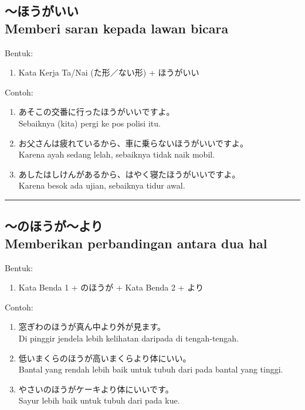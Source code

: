 \subsection*{
    ～ほうがいい \\
    Memberi saran kepada lawan bicara
}
Bentuk:
\begin{enumerate}
    \item Kata Kerja Ta/Nai (た形／ない形) + ほうがいい
\end{enumerate}
Contoh: 
\begin{enumerate}
    \item あそこの交番に行ったほうがいいですよ。
    \\ Sebaiknya (kita) pergi ke pos polisi itu.
    \item お父さんは疲れているから、車に乗らないほうがいいですよ。
    \\ Karena ayah sedang lelah, sebaiknya tidak naik mobil.
    \item あしたはしけんがあるから、はやく寝たほうがいいですよ。
    \\ Karena besok ada ujian, sebaiknya tidur awal.
\end{enumerate}

\vspace{0.2cm}\hrule height 1pt\vspace{0.2cm}

\newpage
\subsection*{
    ～のほうが～より \\
    Memberikan perbandingan antara dua hal
}
Bentuk:
\begin{enumerate}
    \item Kata Benda 1 + のほうが + Kata Benda 2 + より
\end{enumerate}
Contoh: 
\begin{enumerate}
    \item 窓ぎわのほうが真ん中より外が見ます。
    \\ Di pinggir jendela lebih kelihatan daripada di tengah-tengah.
    \item 低いまくらのほうが高いまくらより体にいい。
    \\ Bantal yang rendah lebih baik untuk tubuh dari pada bantal yang tinggi.
    \item やさいのほうがケーキより体にいいです。
    \\ Sayur lebih baik untuk tubuh dari pada kue.
\end{enumerate}

